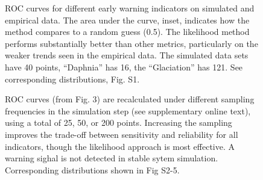 \documentclass{pnastwo}
\begin{document}
 \begin{figure}[h]
   \begin{center}
     \label{fig3}
     \caption{ROC curves for different early warning indicators on simulated and empirical data.  The area under the curve, inset, indicates how the method compares to a random guess (0.5).  The likelihood method performs substantially better than other metrics, particularly on the weaker trends seen in the empirical data. The simulated data sets have 40 points, ``Daphnia'' has 16, the ``Glaciation'' has 121. See corresponding distributions, Fig. S1.}
  \end{center}
 \end{figure}


 \begin{figure}[h!]
   \begin{center}
     \label{fig4}
     \caption{ROC curves (from Fig. 3) are recalculated under different sampling frequencies in the simulation step (see supplementary online text), using a total of 25, 50, or 200 points.  Increasing the sampling improves the trade-off between sensitivity and reliability for all indicators, though the likelihood approach is most effective. A warning sighal is not detected in stable sytem simulation. Corresponding distributions shown in Fig S2-5.} 
  \end{center}
 \end{figure}




\end{document}

